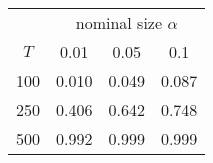 % 
\begin{tabular}{cccc}
  \hline
  & \multicolumn{3}{c}{nominal size $\alpha$} \\
 $T$ & 0.01 & 0.05 & 0.1 \\
 \hline
100 & 0.010 & 0.049 & 0.087 \\ 
  250 & 0.406 & 0.642 & 0.748 \\ 
  500 & 0.992 & 0.999 & 0.999 \\ 
   \hline
\end{tabular}
